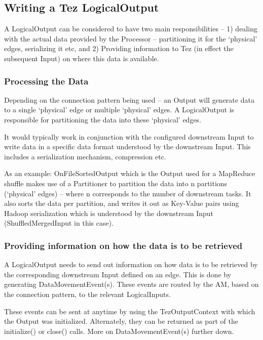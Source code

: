 \documentclass[twocolumn]{article}
\begin{document}
\subsection{Writing a Tez LogicalOutput}

A LogicalOutput can be considered to have two main responsibilities --
1) dealing with the actual data provided by the Processor --
partitioning it for the `physical' edges, serializing it etc, and 2)
Providing information to Tez (in effect the subsequent Input) on where
this data is available.

\subsubsection{Processing the Data}

Depending on the connection pattern being used -- an Output will
generate data to a single `physical' edge or multiple `physical' edges.
A LogicalOutput is responsible for partitioning the data into these
`physical' edges.

It would typically work in conjunction with the configured downstream
Input to write data in a specific data format understood by the
downstream Input. This includes a serialization mechanism, compression
etc.

As an example: OnFileSortedOutput which is the Output used for a
MapReduce shuffle makes use of a Partitioner to partition the data into
n partitions (`physical' edges) -- where n corresponds to the number of
downstream tasks. It also sorts the data per partition, and writes it
out as Key-Value pairs using Hadoop serialization which is understood by
the downstream Input (ShuffledMergedInput in this case).

\subsubsection{Providing information on how the data is to be retrieved}

A LogicalOutput needs to send out information on how data is to be
retrieved by the corresponding downstream Input defined on an edge. This
is done by generating DataMovementEvent(s). These events are routed by
the AM, based on the connection pattern, to the relevant LogicalInputs.

These events can be sent at anytime by using the TezOutputContext with
which the Output was initialized. Alternately, they can be returned as
part of the initialize() or close() calls. More on DataMovementEvent(s)
further down.
\end{document}

